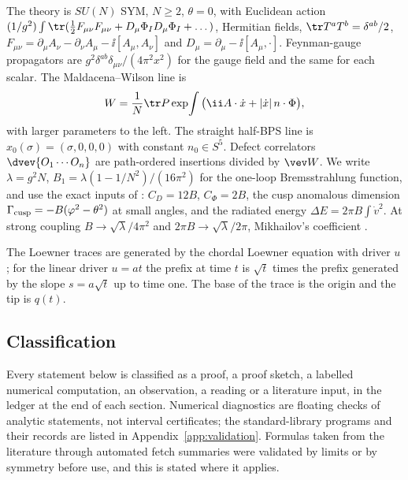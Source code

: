 The theory is $SU(N)$ \Nfour{} SYM, $N\ge2$, $\theta=0$, with Euclidean action
$(1/g^2)\int\tr(\tfrac12F_{\mu\nu}F_{\mu\nu}+D_\mu\Phi_ID_\mu\Phi_I+\dots)$, Hermitian fields,
$\tr T^aT^b=\delta^{ab}/2$, $F_{\mu\nu}=\partial_\mu A_\nu-\partial_\nu A_\mu-\ii[A_\mu,A_\nu]$ and
$D_\mu=\partial_\mu-\ii[A_\mu,\cdot]$. Feynman-gauge propagators are $g^2\delta^{ab}\delta_{\mu\nu}/(4\pi^2x^2)$
for the gauge field and the same for each scalar. The Maldacena--Wilson line is
\begin{equation}
W=\frac1N\tr P\exp\!\int\big(\ii A\cdot\dot x+|\dot x|\,n\cdot\Phi\big),
\end{equation}
with larger parameters to the left. The straight half-BPS line is $x_0(\sigma)=(\sigma,0,0,0)$ with
constant $n_0\in S^5$. Defect correlators $\dvev{O_1\cdots O_n}$ are path-ordered insertions divided by
$\vev W$. We write $\lambda=g^2N$, $B_1=\lambda(1-1/N^2)/(16\pi^2)$ for the one-loop Bremsstrahlung
function, and use the exact inputs of \cite{CHMS}: $C_D=12B$, $C_\Phi=2B$, the cusp anomalous dimension
$\Gamma_{\rm cusp}=-B(\varphi^2-\theta^2)$ at small angles, and the radiated energy $\Delta E=2\pi B\int\dot v^2$.
At strong coupling $B\to\sqrt\lambda/4\pi^2$ and $2\pi B\to\sqrt\lambda/2\pi$, Mikhailov's coefficient
\cite{Mikhailov}.

The Loewner traces are generated by the chordal Loewner equation with driver $u$; for the linear driver
$u=at$ the prefix at time $t$ is $\sqrt t$ times the prefix generated by the slope $s=a\sqrt t$ up to time one.
The base of the trace is the origin and the tip is $q(t)$.

\subsection{Classification}

Every statement below is classified as a proof, a proof sketch, a labelled numerical computation, an
observation, a reading or a literature input, in the ledger at the end of each section. Numerical
diagnostics are floating checks of analytic statements, not interval certificates; the standard-library
programs and their records are listed in Appendix~\ref{app:validation}. Formulas taken from the
literature through automated fetch summaries were validated by limits or by symmetry before use, and
this is stated where it applies.
